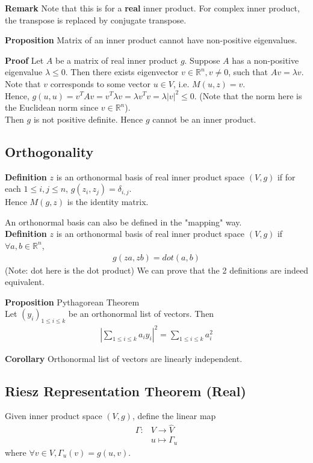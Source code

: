 \documentclass{article}
\begin{document}
\textbf{Remark} Note that this is for a \textbf{real} inner product. For complex inner product, the transpose is replaced by conjugate transpose.

\textbf{Proposition} Matrix of an inner product cannot have non-positive eigenvalues.

\textbf{Proof} Let $A$ be a matrix of real inner product $g$. Suppose $A$ has a non-positive eigenvalue $\lambda \leq 0$. Then there exists eigenvector $v\in \mathbb{R}^n, v\neq 0$, such that $Av=\lambda v$. Note that $v$ corresponds to some vector $u\in V$, i.e. $M(u, z)=v$.\\
Hence, $g(u,u)=v^TAv=v^T\lambda v=\lambda v^Tv = \lambda |v|^2 \leq 0$. (Note that the norm here is the Euclidean norm since $v\in \mathbb{R}^n$).\\
Then $g$ is not positive definite. Hence $g$ cannot be an inner product.

\subsection{Orthogonality}
\textbf{Definition} $z$ is an orthonormal basis of real inner product space $(V,g)$ if for each $1\leq i,j\leq n$, $g(z_i,z_j)=\delta_{i,j}$.\\
Hence $M(g,z)$ is the identity matrix.

An orthonormal basis can also be defined in the "mapping" way.\\
\textbf{Definition} $z$ is an orthonormal basis of real inner product space $(V,g)$ if $\forall a,b\in \mathbb{R}^n$,
\begin{align*}
	g(za, zb) = dot(a,b)
\end{align*}
(Note: dot here is the dot product)
We can prove that the 2 definitions are indeed equivalent.

\textbf{Proposition} Pythagorean Theorem\\
Let $(y_i)_{1\leq i\leq k}$ be an orthonormal list of vectors. Then 
\begin{align*}
	\left\lvert \sum_{1\leq i\leq k}a_iy_i\right\rvert^2 = \sum_{1\leq i\leq k}a_i^2
\end{align*}

\textbf{Corollary} Orthonormal list of vectors are linearly independent.

\subsection{Riesz Representation Theorem (Real)}
Given inner product space $(V,g)$, define the linear map
\begin{align*}
	\Gamma: &V\rightarrow \hat{V}\\
	&u\mapsto \Gamma_u
\end{align*}
where $\forall v\in V, \Gamma_u(v) = g(u,v)$.
\end{document}
